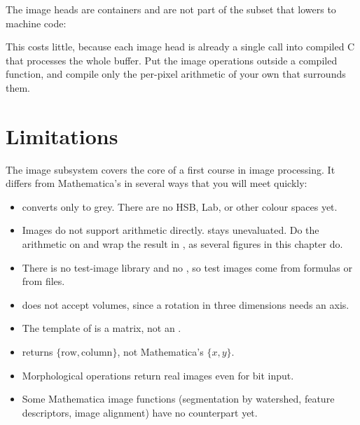 
The image heads are containers and are not part of the subset that
 lowers to machine code:

\begin{codepairs}
\end{codepairs}

This costs little, because each image head is already a single call into compiled
C that processes the whole buffer. Put the image operations outside a compiled
function, and compile only the per-pixel arithmetic of your own that surrounds
them.

\section{Limitations}
\label{sec:img-limits}

The image subsystem covers the core of a first course in image processing. It
differs from Mathematica's in several ways that you will meet quickly:

\begin{itemize}
\item {} converts only to grey. There are no HSB, Lab, or other
colour spaces yet.
\item Images do not support arithmetic directly.  stays unevaluated. Do the arithmetic on 
and wrap the result in , as several figures in this chapter do.
\item There is no  test-image library and no
, so test images come from formulas or from files.
\item {} does not accept volumes, since a rotation in three
dimensions needs an axis.
\item The template of  is a matrix, not an
.
\item {} returns \(\{\text{row}, \text{column}\}\), not
Mathematica's \(\{x, y\}\).
\item Morphological operations return real images even for bit input.
\item Some Mathematica image functions (segmentation by watershed, feature
descriptors, image alignment) have no counterpart yet.
\end{itemize}


